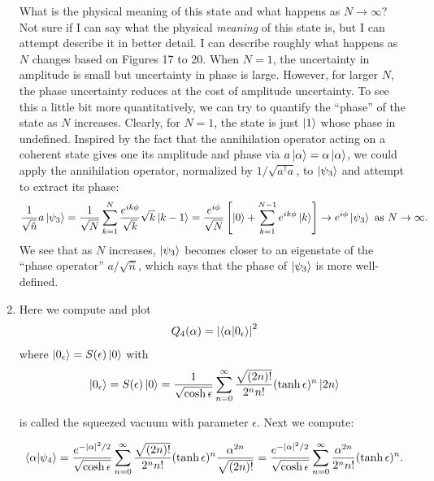 \documentclass{article}
\theoremstyle{definition}
\newcommand{\al}{\alpha}
\newcommand{\f}[2]{\frac{#1}{#2}}
\newcommand{\lb}{\left[}
\newcommand{\rb}{\right]}
\begin{document}
\begin{enumerate}[label=\alph*)]
	What is the physical meaning of this state and what happens as $N\to \infty$? Not sure if I can say what the physical \textit{meaning} of this state is, but I can attempt describe it in better detail. I can describe roughly what happens as $N$ changes based on Figures 17 to 20. When $N=1$,  the uncertainty in amplitude is small but uncertainty in phase is large. However, for larger $N$, the phase uncertainty reduces at the cost of amplitude uncertainty. To see this a little bit more quantitatively, we can try to quantify the ``phase'' of the state as $N$ increases. Clearly, for $N=1$, the state is just $\ket{1}$ whose phase in undefined.  Inspired by the fact that the annihilation operator acting on a coherent state gives one its amplitude and phase via $a\ket{\al} = \al\ket{\al}$, we could apply the annihilation operator, normalized by $1/\sqrt{{a^\dagger a}}$, to $\ket{\psi_3}$ and attempt to extract its phase:
	\begin{align*}
	\f{1}{\sqrt{\hat{n}}}a\ket{\psi_3} 
	= \f{1}{\sqrt{N}} \sum_{k=1}^N \f{e^{ik\phi}}{\sqrt{k}} \sqrt{k} \ket{k-1}
	= \f{e^{i\phi}}{\sqrt{N}}\lb \ket{0} + \sum_{k=1}^{N-1} e^{ik\phi} \ket{k} \rb \to e^{i\phi} \ket{\psi_3} \text{ as } N\to \infty.
	\end{align*}
	We see that as $N$ increases, $\ket{\psi_3}$ becomes closer to an eigenstate of the ``phase operator'' $a/\sqrt{\hat{n}}$, which says that the phase of $\ket{\psi_3}$ is more well-defined. 

	
	
	\item  Here we compute and plot 
	\begin{align*}
		Q_4(\al) = \abs{\braket{\al}{0_\epsilon}}^2
	\end{align*}
	where $\ket{0_\epsilon} = S(\epsilon)\ket{0}$ with
	\begin{align*}
		\ket{0_\epsilon} = S(\epsilon)\ket{0} = 
		\f{1}{\sqrt{\cosh \epsilon}} \sum_{n=0}^\infty \f{ \sqrt{(2n)!} }{2^n n!} (\tanh \epsilon)^n \ket{2n}
	\end{align*}
	
	is called the squeezed vacuum with parameter $\epsilon$. Next we compute:
	
	
	\begin{align*}
		\braket{\al}{\psi_4} = \f{e^{-\abs{\al}^2/2}}{\sqrt{\cosh \epsilon}} \sum_{n=0}^\infty \f{ \sqrt{(2n)!} }{2^n n!} (\tanh \epsilon)^n \f{\al^{2n}}{\sqrt{(2n)!}} = 
		\f{e^{-\abs{\al}^2/2}}{\sqrt{\cosh \epsilon}} \sum_{n=0}^\infty \f{ \al^{2n} }{2^n n!} (\tanh \epsilon)^n.
	\end{align*}
	

\end{enumerate}
\end{document}
